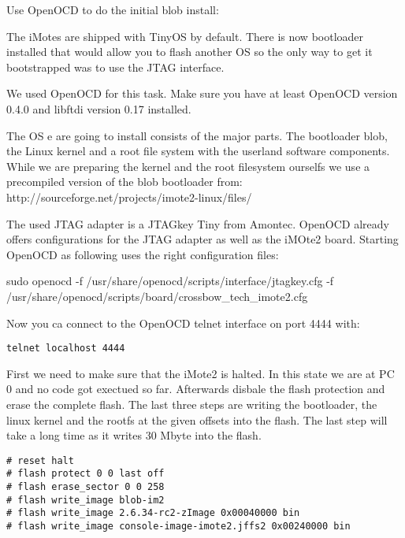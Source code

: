 Use OpenOCD to do the initial blob install:

The iMotes are shipped with TinyOS by default. There is now bootloader installed
that would allow you to flash another OS so the only way to get it bootstrapped
was to use the JTAG interface.

We used OpenOCD for this task. Make sure you have at least OpenOCD version 0.4.0
and libftdi version 0.17 installed.

The OS e are going to install consists of the major parts. The bootloader blob, the
Linux kernel and a root file system with the userland software components. While
we are preparing the kernel and the root filesystem ourselfs we use a
precompiled version of the blob bootloader from:
http://sourceforge.net/projects/imote2-linux/files/

The used JTAG adapter is a JTAGkey Tiny from Amontec. OpenOCD already offers
configurations for the JTAG adapter as well as the iMOte2 board. Starting
OpenOCD as following uses the right configuration files:

sudo openocd -f /usr/share/openocd/scripts/interface/jtagkey.cfg -f \\
/usr/share/openocd/scripts/board/crossbow\_tech\_imote2.cfg

Now you ca connect to the OpenOCD telnet interface on port 4444 with:

\begin{verbatim}
telnet localhost 4444
\end{verbatim}

First we need to make sure that the iMote2 is halted. In this state we are at PC
0 and no code got exectued so far. Afterwards disbale the flash protection and
erase the complete flash. The last three steps are writing the bootloader, the
linux kernel and the rootfs at the given offsets into the flash. The last step
will take a long time as it writes 30 Mbyte into the flash.

\begin{verbatim}
# reset halt
# flash protect 0 0 last off
# flash erase_sector 0 0 258
# flash write_image blob-im2
# flash write_image 2.6.34-rc2-zImage 0x00040000 bin
# flash write_image console-image-imote2.jffs2 0x00240000 bin
\end{verbatim}
